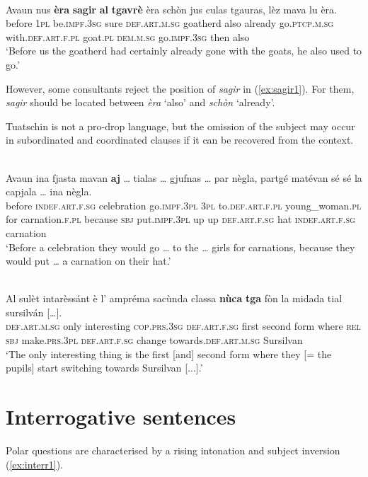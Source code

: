 \ea
\label{ex:sagir1}
\\
	\gll    Avaun nus \textbf{èra} \textbf{sagir} \textbf{al} \textbf{tgavrè} èra schòn jus culas tgauras, lèz mava lu èra.\\
before \textsc{1pl} be.\textsc{impf.3sg} sure \textsc{def.art.m.sg} goatherd also already go.\textsc{ptcp.m.sg} with.\textsc{def.art.f.pl} goat.\textsc{pl} \textsc{dem.m.sg} go.\textsc{impf.3sg} then also\\
\glt `Before us the goatherd had certainly already gone with the goats, he also used to go.'
\z

However, some consultants reject the position of \textit{sagir} in (\ref{ex:sagir1}). For them, \textit{sagir} should be located between \textit{èra} `also' and \textit{schòn} `already'.

Tuatschin is not a pro-drop language, but the omission of the subject may occur in subordinated and coordinated clauses if it can be recovered from the context.

\ea
\label{}
\\
\gll    Avaun ina fjasta mavan \textbf{aj} … tialas … gjufnas … par nègla, partgé \longrule matévan sé sé la capjala … ina nègla.\\
before \textsc{indef.art.f.sg} celebration go.\textsc{impf.3pl} \textsc{3pl} {} to.\textsc{def.art.f.pl} {}  young\_woman.\textsc{pl} {} for carnation.\textsc{f.pl} because \textsc{sbj}  put.\textsc{impf.3pl} up up  \textsc{def.art.f.sg} hat {} \textsc{indef.art.f.sg} carnation \\
\glt `Before a celebration they would go … to the … girls for carnations, because they would put … a carnation on their hat.'
\z

\ea
\label{}
\\
 \gll    Al sulèt intarèssánt è l’ ampréma sacùnda classa \textbf{nùca} \textbf{tga} \longrule fòn la midada tial sursilván […].\\
 \textsc{def.art.m.sg} only interesting \textsc{cop.prs.3sg} \textsc{def.art.f.sg} first second form where \textsc{rel} \textsc{sbj} make.\textsc{prs.3pl} \textsc{def.art.f.sg} change towards.\textsc{def.art.m.sg} Sursilvan\\
 \glt `The only interesting thing is the first [and] second form where they [= the pupils] start switching towards Sursilvan [...].'
 \z
 

\section{Interrogative sentences}
Polar questions are characterised by a rising intonation and subject inversion (\ref{ex:interr1}).

